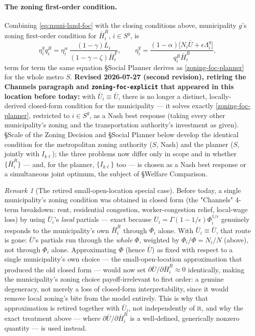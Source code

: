 \documentclass[12pt, a4paper]{article}
\theoremstyle{definition}
\theoremstyle{remark}
\newtheorem*{remark}{Remark}
\begin{document}
\paragraph{The zoning first-order condition.} Combining \eqref{eq:muni-land-foc} with the closing conditions above, municipality $g$'s zoning first-order condition for $\bar H_i^R$, $i\in S^g$, is
\[
\eta_i^q q_i^R = \eta_i^w\,\frac{(1-\gamma)L_i}{(1-\gamma-\zeta)\bar H_i^F}, \qquad \eta_i^q=\frac{(1-\alpha)\bigl[N_i\bar U+\epsilon\Lambda_i^q\bigr]}{q_i^R\bar H_i^R},
\]
term for term the same equation \S Social Planner derives as \eqref{zoning-foc-planner} for the whole metro $S$. \textbf{Revised 2026-07-27 (second revision), retiring the Channels paragraph and \texttt{zoning-foc-explicit} that appeared in this location before today:} with $\bar U_i\equiv\bar U$, there is no longer a distinct, locally-derived closed-form condition for the municipality — it solves exactly \eqref{zoning-foc-planner}, restricted to $i\in S^g$, as a Nash best response (taking every other municipality's zoning and the transportation authority's investment as given). \S Scale of the Zoning Decision and \S Social Planner below develop the identical condition for the metropolitan zoning authority ($S$, Nash) and the planner ($S$, jointly with $I_{k\ell}$); the three problems now differ only in scope and in whether $\{\bar H_i^R\}$ — and, for the planner, $\{I_{k\ell}\}$ too — is chosen as a Nash best response or a simultaneous joint optimum, the subject of \S Welfare Comparison.

\begin{remark}[The retired small-open-location special case]
Before today, a single municipality's zoning condition was obtained in closed form (the "Channels" 4-term breakdown: rent, residential congestion, worker-congestion relief, local-wage loss) by using $\bar U_i$'s \emph{local} partials — exact because $\bar U_i=\Gamma(1-1/\epsilon)\Phi_i^{1/\epsilon}$ genuinely responds to the municipality's own $\bar H_i^R$ through $\Phi_i$ alone. With $\bar U_i\equiv\bar U$, that route is gone: $\bar U$'s partials run through the \emph{whole} $\Phi$, weighted by $\Phi_i/\Phi=N_i/N$ (above), not through $\Phi_i$ alone. Approximating $\Phi$ (hence $\bar U$) as fixed with respect to a single municipality's own choice — the small-open-location approximation that produced the old closed form — would now set $\partial\bar U/\partial\bar H_i^R\approx0$ identically, making the municipality's zoning choice payoff-irrelevant to first order: a genuine degeneracy, not merely a loss of closed-form interpretability, since it would remove local zoning's bite from the model entirely. This is why that approximation is retired together with $\bar U_i$, not independently of it, and why the exact treatment above — where $\partial\bar U/\partial\bar H_i^R$ is a well-defined, generically nonzero quantity — is used instead.
\end{remark}
\end{document}
